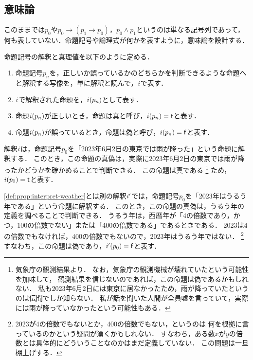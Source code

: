 \subsection{意味論}

このままでは$p_0$や$p_0 \to (p_1 \to p_0)$，$p_0 \land p_1$というのは単なる記号列であって，
何も表していない．命題記号や論理式が何かを表すように，意味論を設計する．

\begin{myDefinition}[命題記号の解釈]
  \label{def:prop:interpret-props}
  命題記号の解釈と真理値を以下のように定める．
  \begin{enumerate}
    \item 命題記号$p_n$を，正しいか誤っているかのどちらかを判断できるような命題へと解釈する写像を，単に解釈と読んで，$i$で表す．
    \item $i$で解釈された命題を，$i(p_n)$として表す．
    \item 命題$i(p_n)$が正しいとき，命題は真と呼び，$i(p_n) = \mathsf{t}$と表す．
    \item 命題$i(p_n)$が誤っているとき，命題は偽と呼び，$i(p_n) = \mathsf{f}$と表す．
  \end{enumerate}
\end{myDefinition}

\begin{myExample}
  \label{def:prop:interpret-weather}
  解釈$i$は，命題記号$p_0$を「2023年6月2日の東京では雨が降った」という命題に解釈する．
  このとき，この命題の真偽は，実際に2023年6月2日の東京では雨が降ったかどうかを確かめることで判断できる．
  この命題は真である
  \footnote{
    気象庁の観測結果より．
    なお，気象庁の観測機械が壊れていたという可能性を加味して，
    観測結果を信じないのであれば，この命題は偽であるかもしれない．
    私も2023年6月2日には東京に居なかったため，雨が降っていたというのは伝聞でしか知らない．
    私が話を聞いた人間が全員嘘を言っていて，実際には雨が降っていなかったという可能性もある．
  }
  ため，$i(p_0) = \mathsf{t}$と表す．
\end{myExample}

\begin{myExample}
  \label{def:prop:leapyear}
  \ref{def:prop:interpret-weather}とは別の解釈$i'$では，命題記号$p_0$を「2023年はうるう年である」という命題に解釈する．
  このとき，この命題の真偽は，うるう年の定義を調べることで判断できる．
  うるう年は，西暦年が「4の倍数であり，かつ，100の倍数でない」または「400の倍数である」であるときである．
  2023は4の倍数でもなければ，400の倍数でもないので，2023年はうるう年ではない．
  \footnote{
    2023が4の倍数でもないとか，400の倍数でもない，というのは
    何を根拠に言っているのかという疑問が湧くかもしれない．
    すなわち，ある数$x$が$y$の倍数とは具体的にどういうことなのかはまだ定義していない．
    この問題は一旦棚上げする．
  }
  すなわち，この命題は偽であり，$i'(p_0) = \mathsf{f}$と表す．
\end{myExample}

